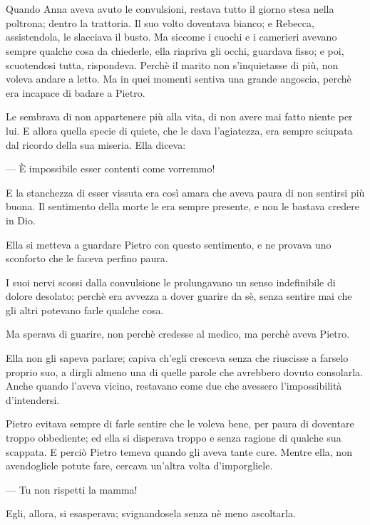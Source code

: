 \chapter{}

Quando Anna aveva avuto le convulsioni, restava tutto il giorno stesa nella poltrona; dentro la trattoria. Il suo volto doventava bianco; e Rebecca, assistendola, le slacciava il busto. Ma siccome i cuochi e i camerieri avevano sempre qualche cosa da chiederle, ella riapriva gli occhi, guardava fisso; e poi, scuotendosi tutta, rispondeva. Perchè il marito non s’inquietasse di più, non voleva andare a letto. Ma in quei momenti sentiva una grande angoscia, perchè era incapace di badare a Pietro.

Le sembrava di non appartenere più alla vita, di non avere mai fatto niente per lui. E allora quella specie di quiete, che le dava l’agiatezza, era sempre sciupata dal ricordo della sua miseria. Ella diceva:

— È impossibile esser contenti come vorremmo!

E la stanchezza di esser vissuta era così amara che aveva paura di non sentirsi più buona. Il sentimento della morte le era sempre presente, e non le bastava credere in Dio.

Ella si metteva a guardare Pietro con questo sentimento, e ne provava uno sconforto che le faceva perfino paura.

I suoi nervi scossi dalla convulsione le prolungavano un senso indefinibile di dolore desolato; perchè era avvezza a dover guarire da sè, senza sentire mai che gli altri potevano farle qualche cosa.

Ma sperava di guarire, non perchè credesse al medico, ma perchè aveva Pietro.

Ella non gli sapeva parlare; capiva ch'egli cresceva senza che riuscisse a farselo proprio suo, a dirgli almeno una di quelle parole che avrebbero dovuto consolarla. Anche quando l'aveva vicino, restavano come due che avessero l'impossibilità d'intendersi.

Pietro evitava sempre di farle sentire che le voleva bene, per paura di doventare troppo obbediente; ed ella si disperava troppo e senza ragione di qualche sua scappata. E perciò Pietro temeva quando gli aveva tante cure. Mentre ella, non avendogliele potute fare, cercava un'altra volta d'imporgliele.

— Tu non rispetti la mamma!

Egli, allora, si esasperava; svignandosela senza nè meno ascoltarla.


